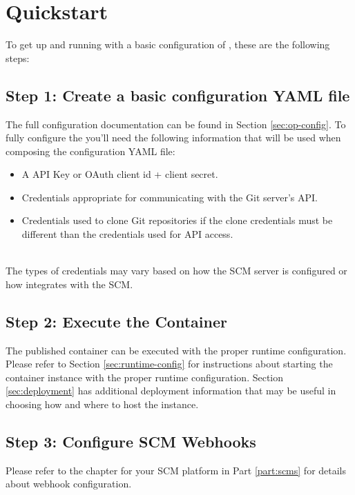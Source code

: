 \chapter{Quickstart}

To get up and running with a basic configuration of \cxoneflow, these are the following steps:


\section{Step 1: Create a basic configuration YAML file}

The full configuration documentation can be found in Section \ref{sec:op-config}. To fully configure the \cxoneflow you'll need
the following information that will be used when composing the configuration YAML file:

\begin{itemize}
    \item A \cxone API Key or OAuth client id + client secret.
    \item Credentials appropriate for communicating with the Git server's API.
    \item Credentials used to clone Git repositories if the clone credentials must be different than the credentials used for API access.
\end{itemize}

\noindent\\The types of credentials may vary based on how the SCM server is configured or how \cxoneflow
integrates with the SCM.

\section{Step 2: Execute the \cxoneflow Container}

The published \cxoneflow container can be executed with the proper runtime configuration.  Please refer
to Section \ref{sec:runtime-config} for instructions about starting the \cxoneflow container instance with
the proper runtime configuration. Section \ref{sec:deployment} has additional deployment information that
may be useful in choosing how and where to host the \cxoneflow instance.


\section{Step 3: Configure SCM Webhooks}

Please refer to the chapter for your SCM platform in Part \ref{part:scms} for details about webhook configuration.


